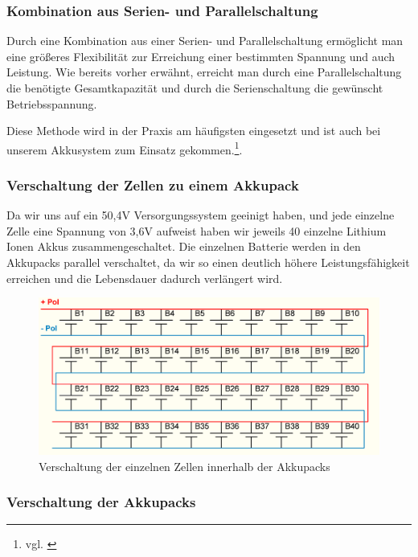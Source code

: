 \subsubsection{Kombination aus Serien- und Parallelschaltung}
Durch eine Kombination aus einer Serien- und Parallelschaltung ermöglicht man eine größeres Flexibilität zur Erreichung einer bestimmten Spannung und auch Leistung. Wie bereits vorher erwähnt, erreicht man durch eine Parallelschaltung die benötigte Gesamtkapazität und durch die Serienschaltung die gewünscht Betriebsspannung.

Diese Methode wird in der Praxis am häufigsten eingesetzt und ist auch bei unserem Akkusystem zum Einsatz gekommen.\footnote{vgl. \cite{Kombinationsch}}.

\subsubsection{Verschaltung der Zellen zu einem Akkupack}

Da wir uns auf ein 50,4V Versorgungssystem geeinigt haben, und jede einzelne Zelle eine Spannung von 3,6V aufweist haben wir jeweils 40 einzelne Lithium Ionen Akkus zusammengeschaltet. Die einzelnen Batterie werden in den Akkupacks parallel verschaltet, da wir so einen deutlich höhere Leistungsfähigkeit erreichen und die Lebensdauer dadurch verlängert wird. 

\begin{figure}[H]
	\begin{center}
		\includegraphics[scale=0.6]{figures/Akku/Anschlussplan 40Zellen.PNG}
		\caption{Verschaltung der einzelnen Zellen innerhalb der Akkupacks}
		\label{fig: Verschaltung der einzelnen Zellen innerhalb der Akkupacks}
	\end{center}
\end{figure}
\newpage

\subsubsection{Verschaltung der Akkupacks}

